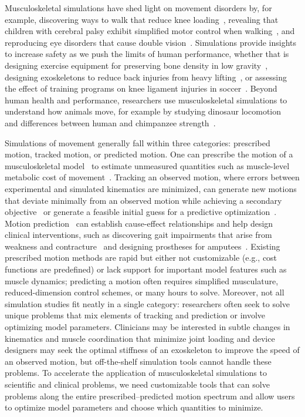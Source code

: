 \documentclass[10pt,letterpaper]{article}
\begin{document}
Musculoskeletal simulations have shed light on movement disorders by, for example, discovering ways to walk that reduce knee loading~\cite{Fregly:2007ac}, revealing that children with cerebral palsy exhibit simplified motor control when walking~\cite{Steele:2015}, and reproducing eye disorders that cause double vision~\cite{Priamikov:2016}. Simulations provide insights to increase safety as we push the limits of human performance, whether that is designing exercise equipment for preserving bone density in low gravity~\cite{Fregly:2015}, designing exoskeletons to reduce back injuries from heavy lifting~\cite{Manns:2016}, or assessing the effect of training programs on knee ligament injuries in soccer~\cite{Thompson:2017}. Beyond human health and performance, researchers use musculoskeletal simulations to understand how animals move, for example by studying dinosaur locomotion~\cite{sthaya:2005uk} and differences between human and chimpanzee strength~\cite{ONeill:2017}.

Simulations of movement generally fall within three categories: prescribed motion, tracked motion, or predicted motion. One can prescribe the motion of a musculoskeletal model~\cite{Thelen:2003bba,Lloyd:2003} to estimate unmeasured quantities such as muscle-level metabolic cost of movement~\cite{Farris:2014du,Jackson:2017go}. Tracking an observed motion, where errors between experimental and simulated kinematics are minimized, can generate new motions that deviate minimally from an observed motion while achieving a secondary objective~\cite{Fregly:2007ac} or generate a feasible initial guess for a predictive optimization~\cite{Lin:2017jp}. Motion prediction~\cite{Geijtenbeek:2019} can establish cause-effect relationships and help design clinical interventions, such as discovering gait impairments that arise from weakness and contracture~\cite{Ong:2019a} and designing prostheses for amputees~\cite{Handford:2016kd}. Existing prescribed motion methods are rapid but either not customizable (e.g., cost functions are predefined) or lack support for important model features such as muscle dynamics; predicting a motion often requires simplified musculature, reduced-dimension control schemes, or many hours to solve. Moreover, not all simulation studies fit neatly in a single category: researchers often seek to solve unique problems that mix elements of tracking and prediction or involve optimizing model parameters. Clinicians may be interested in subtle changes in kinematics and muscle coordination that minimize joint loading and device designers may seek the optimal stiffness of an exoskeleton to improve the speed of an observed motion, but off-the-shelf simulation tools cannot handle these problems. To accelerate the application of musculoskeletal simulations to scientific and clinical problems, we need customizable tools that can solve problems along the entire prescribed–predicted motion spectrum and allow users to optimize model parameters and choose which quantities to minimize.
\end{document}
